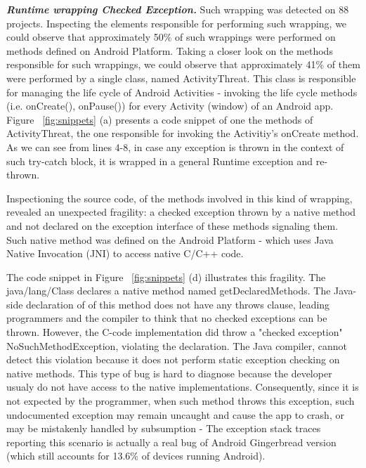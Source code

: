 \documentclass[conference]{IEEEtran}
\begin{document}
\emph{\textbf{Runtime wrapping Checked Exception.}} Such wrapping was 
detected on 88 projects. Inspecting the elements responsible for performing such wrapping, we could observe that
approximately  50\% of such wrappings were performed on methods defined on Android
Platform. Taking a closer look on the methods responsible for such wrappings,
 we could observe that approximately 41\% of them were performed by a single class,
 named ActivityThreat. This class is responsible for managing the life cycle of  Android Activities - 
invoking the life cycle methods (i.e. onCreate(), onPause()) for every Activity 
(window) of an Android app.
Figure ~\ref{fig:snippets} (a) presents a code snippet of one the methods of 
ActivityThreat,  the one responsible for invoking the Activitiy's onCreate method. 
As we can see from lines 4-8, in case any exception is thrown in the context of such try-catch block, 
it is wrapped in a general Runtime exception and re-thrown.


Inspectioning the source code, of the methods involved in this kind of wrapping,
revealed an unexpected fragility: a checked exception thrown by a native method and not
declared on the exception interface of these methods signaling them. Such native method 
was defined on the Android Platform -  which uses Java Native Invocation (JNI) to access 
native C/C++ code. 

The code snippet in Figure ~\ref{fig:snippets} (d) illustrates this fragility.
 The java/lang/Class declares a native method named getDeclaredMethods. 
The Java-side declaration of of this method does not have any throws clause, 
leading programmers and the compiler to think that no checked exceptions can be thrown.
 However, the C-code implementation did throw a "checked exception" NoSuchMethodException, 
violating the declaration. The Java compiler, cannot detect this violation because it does 
not perform static exception checking on native methods. This type of bug is hard to diagnose
because the developer usualy do not have access to the native implementations. 
Consequently, since it is not expected by the programmer, when such method throws 
this exception, such undocumented exception may remain
uncaught and cause the app to crash, or may be mistakenly handled by subsumption - 
The exception stack traces reporting this scenario is actually a real bug of Android 
Gingerbread version (which still accounts for 13.6\% of devices running Android).
\end{document}
